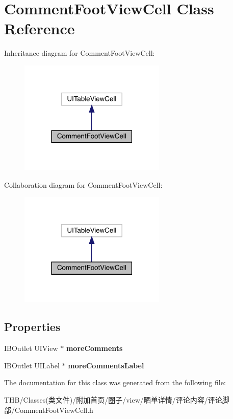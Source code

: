 \hypertarget{interface_comment_foot_view_cell}{}\section{Comment\+Foot\+View\+Cell Class Reference}
\label{interface_comment_foot_view_cell}


Inheritance diagram for Comment\+Foot\+View\+Cell\+:\nopagebreak
\begin{figure}[H]
\begin{center}
\leavevmode
\includegraphics[width=198pt]{interface_comment_foot_view_cell__inherit__graph}
\end{center}
\end{figure}


Collaboration diagram for Comment\+Foot\+View\+Cell\+:\nopagebreak
\begin{figure}[H]
\begin{center}
\leavevmode
\includegraphics[width=198pt]{interface_comment_foot_view_cell__coll__graph}
\end{center}
\end{figure}
\subsection*{Properties}
\begin{DoxyCompactItemize}
\item 
\mbox{\label{interface_comment_foot_view_cell_a8d26cd888d5843b6f7851840f93f571b}} 
I\+B\+Outlet U\+I\+View $\ast$ {\bfseries more\+Comments}
\item 
\mbox{\label{interface_comment_foot_view_cell_a9548b649b3933c41e16fda740651e32e}} 
I\+B\+Outlet U\+I\+Label $\ast$ {\bfseries more\+Comments\+Label}
\end{DoxyCompactItemize}


The documentation for this class was generated from the following file\+:\begin{DoxyCompactItemize}
\item 
T\+H\+B/\+Classes(类文件)/附加首页/圈子/view/晒单详情/评论内容/评论脚部/Comment\+Foot\+View\+Cell.\+h\end{DoxyCompactItemize}
